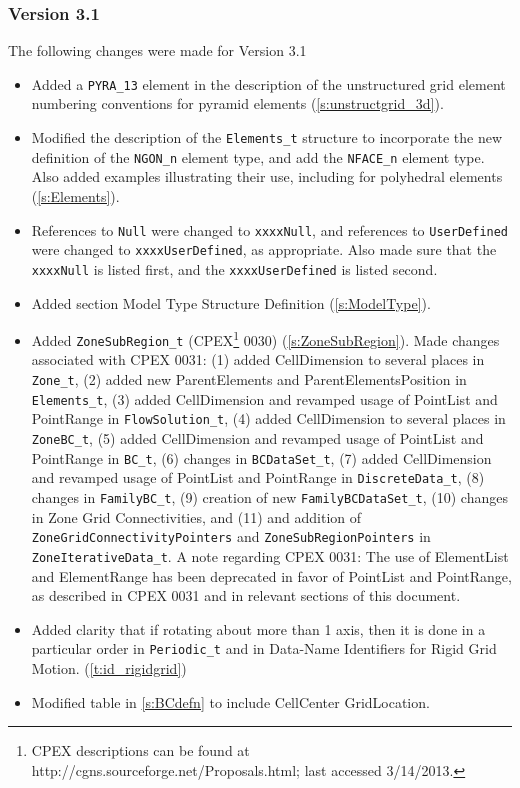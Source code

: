 \subsubsection{Version 3.1}
The following changes were made for Version 3.1

\begin{itemize}
\item Added a \texttt{PYRA\_13} element in the description of the unstructured grid 
      element numbering conventions for pyramid elements
      (\autoref{s:unstructgrid_3d}).
\item Modified the description of the \texttt{Elements\_t} structure to incorporate 
      the new definition of the \texttt{NGON\_n} element type, and add the 
      \texttt{NFACE\_n} element type. Also added examples illustrating their use, 
      including for polyhedral elements
      (\autoref{s:Elements}).
\item References to \texttt{Null} were changed to \texttt{xxxxNull}, and references to 
      \texttt{UserDefined} were changed to \texttt{xxxxUserDefined}, as appropriate. 
      Also made sure that the \texttt{xxxxNull} is listed first, and the 
      \texttt{xxxxUserDefined} is listed second.
\item Added section Model Type Structure Definition
      (\autoref{s:ModelType}).
\item Added \texttt{ZoneSubRegion\_t} (CPEX\footnote{CPEX descriptions can be found
      at http://cgns.sourceforge.net/Proposals.html; last accessed 3/14/2013.}
      0030) (\autoref{s:ZoneSubRegion}). 
      Made changes associated with CPEX 
      0031: (1) added CellDimension to several places in \texttt{Zone\_t}, (2) added 
      new ParentElements and ParentElementsPosition in \texttt{Elements\_t}, 
      (3) added CellDimension and revamped usage of PointList and PointRange in 
      \texttt{FlowSolution\_t}, (4) added CellDimension to several places in 
      \texttt{ZoneBC\_t}, (5) added CellDimension and revamped usage of PointList 
      and PointRange in \texttt{BC\_t}, (6) changes in \texttt{BCDataSet\_t}, 
      (7) added CellDimension and revamped usage of PointList and PointRange in 
      \texttt{DiscreteData\_t}, (8) changes in \texttt{FamilyBC\_t}, (9) creation 
      of new \texttt{FamilyBCDataSet\_t}, (10) changes in Zone Grid Connectivities, 
      and (11) and addition of \texttt{ZoneGridConnectivityPointers} and 
      \texttt{ZoneSubRegionPointers} in \texttt{ZoneIterativeData\_t}. 
      A note regarding CPEX 0031:  The use of ElementList and ElementRange has been
      deprecated in favor of PointList and PointRange, as described in CPEX 0031 and
      in relevant sections of this document.
\item Added clarity that if rotating about more than 1 axis, then it is done in a 
      particular order in \texttt{Periodic\_t} and in Data-Name Identifiers for 
      Rigid Grid Motion. 
      (\autoref{t:id_rigidgrid})
\item Modified table in \autoref{s:BCdefn} to include CellCenter GridLocation.
\end{itemize}

